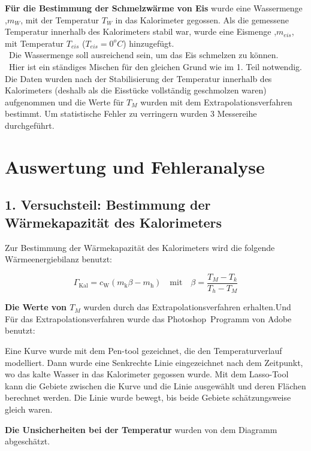 \documentclass[11pt,a4paper]{article} %
\begin{document}
\textbf{Für die Bestimmung der Schmelzw\"arme von Eis} wurde eine Wassermenge ,$m_W$, mit der Temperatur $T_W$ in das Kalorimeter gegossen. Als die gemessene Temperatur innerhalb des Kalorimeters stabil war, wurde eine Eismenge ,$m_{eis}$, mit Temperatur $T_{eis}$ ($T_{eis}=0 ^oC$) hinzugef\"ugt.
\\\
Die Wassermenge soll ausreichend sein, um das Eis schmelzen zu können.
\\\
Hier ist ein st\"andiges Mischen f\"ur den gleichen Grund wie im 1. Teil notwendig.
Die Daten wurden nach der Stabilisierung der Temperatur innerhalb des Kalorimeters (deshalb als die Eisstücke vollständig geschmolzen waren) aufgenommen und die Werte für $T_M$ wurden mit dem Extrapolationsverfahren bestimmt.
Um statistische Fehler zu verringern wurden 3 Messereihe durchgef\"uhrt.



 \section{Auswertung und Fehleranalyse}

\subsection{1. Versuchsteil: Bestimmung der Wärmekapazität des Kalorimeters}

Zur Bestimmung der Wärmekapazität des Kalorimeters wird die folgende Wärmeenergiebilanz benutzt:

\begin{equation}
 \Gamma_\textrm{Kal} = c_\textrm{W}(m_\textrm{k}\beta-m_\textrm{h})  \quad \textrm{mit} \quad \beta = \frac{T_M-T_k}{T_h-T_M}
\end{equation}

\textbf{Die  Werte von $T_M$} wurden durch das Extrapolationsverfahren erhalten.Und Für das Extrapolationsverfahren wurde das Photoshop\textregistered \ Programm von Adobe benutzt: 

Eine Kurve wurde mit dem Pen-tool gezeichnet, die den Temperaturverlauf modelliert. Dann wurde eine Senkrechte Linie eingezeichnet nach dem Zeitpunkt, wo das kalte Wasser in das Kalorimeter gegossen wurde. 
Mit dem Lasso-Tool kann die Gebiete zwischen die Kurve und die Linie ausgewählt und deren Flächen berechnet werden. Die Linie wurde bewegt, bis beide Gebiete schätzungsweise gleich waren.

\textbf{Die Unsicherheiten bei der Temperatur} wurden von dem Diagramm abgeschätzt. 
\end{document}
